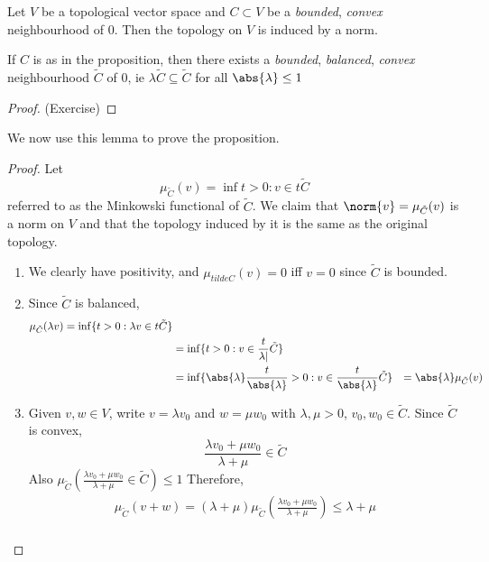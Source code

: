 \documentclass{article}
\begin{document}
\begin{prop}
    Let $V$ be a topological vector space and $C \subset V$ be a \emph{bounded}, \emph{convex} neighbourhood of $0$. Then the topology on $V$ is induced by a norm.
\end{prop}
\begin{lemma}
    If $C$ is as in the proposition, then there exists a \emph{bounded}, \emph{balanced}, \emph{convex} neighbourhood $\tilde C$ of $0$, ie $\lambda \tilde C \subseteq \tilde C$ for all $\abs{\lambda} \leq 1$
\end{lemma}
\begin{proof}
    (Exercise)
\end{proof}
We now use this lemma to prove the proposition.
\begin{proof}
    Let
    \begin{equation}
        \mu_{\tilde C}(v) = \inf{t > 0 : v \in t \tilde C}
    \end{equation}
    referred to as the Minkowski functional of $\tilde C$.
    We claim that $\norm{v} = \mu_{\tilde C}(v)$ is a norm on $V$ and that the topology induced by it is the same as the original topology.
    \begin{enumerate} %
        \item We clearly have positivity, and $\mu_{tilde C}(v) = 0$ iff $v = 0$ since $\tilde C$ is bounded.
        \item Since $\tilde C$ is balanced,
            \begin{align}
                \mu_{\tilde C} (\lambda v) = \inf\{t > 0 : \lambda v \in t \tilde C\} \\
                &= \inf\{t > 0: v \in \frac{t}{\lambda|} \tilde C\} \\
                &= \inf\{\abs{\lambda} \frac{t}{\abs{\lambda}} > 0 : v \in \frac{t}{\abs{\lambda}} \tilde C\}
                &= \abs{\lambda} \mu_{\tilde C}(v)
            \end{align}
        \item Given $v, w \in V$, write $v = \lambda v_0$ and $w = \mu w_0$ with $\lambda, \mu > 0$, $v_0, w_0 \in \tilde C$.
            Since $\tilde C$ is convex,
            \begin{equation}
                \frac{\lambda v_0 + \mu w_0}{\lambda + \mu} \in \tilde C
            \end{equation}
            Also $\mu_{\tilde C}(\frac{\lambda v_0 + \mu w_0}{\lambda + \mu} \in \tilde C) \leq 1$
            Therefore,
            \begin{align}
                \mu_{\tilde C} (v + w) = (\lambda + \mu) \mu_{\tilde C} (\frac{\lambda v_0 + \mu w_0}{\lambda + \mu}) \leq \lambda + \mu \\
            \end{align}
    \end{enumerate}
\end{proof}
\end{document}
